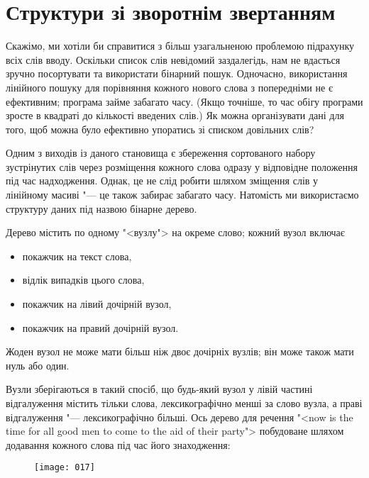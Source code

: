 \documentclass[a4paper,12pt]{book}
\begin{document}
\section{Структури зі зворотнім звертанням}


  Скажімо, ми хотіли би справитися з більш узагальненою проблемою підрахунку всіх слів
  вводу. Оскільки список слів невідомий заздалегідь, нам не вдасться зручно посортувати
  та використати бінарний пошук. Одночасно, використання лінійного пошуку для порівняння
  кожного нового слова з попередніми не є ефективним; програма займе забагато часу. (Якщо
  точніше, то час обігу програми зросте в квадраті до кількості введених слів.) Як можна
  організувати дані для того, щоб можна було ефективно упоратись зі списком довільних
  слів?

  Одним з виходів із даного становища є збереження сортованого набору зустрінутих слів
  через розміщення кожного слова одразу у відповідне положення під час надходження.
  Однак, це не слід робити шляхом зміщення слів у лінійному масиві "--- це також забирає
  забагато часу. Натомість ми використаємо структуру даних під назвою бінарне дерево.

  Дерево містить по одному "<вузлу"> на окреме слово; кожний вузол включає
  \begin{itemize}
    \item покажчик на текст слова,
    \item відлік випадків цього слова,
    \item покажчик на лівий дочірній вузол,
    \item покажчик на правий дочірній вузол.
  \end{itemize}

  Жоден вузол не може мати більш ніж двоє дочірніх вузлів; він може також мати нуль
  або один.

  Вузли зберігаються в такий спосіб, що будь-який вузол у лівій частині відгалуження
  містить тільки слова, лексикографічно менші за слово вузла, а праві відгалуження "---
  лексикографічно більші. Ось дерево для речення "<now is the time for all good men to
  come to the aid of their party"> побудоване шляхом додавання кожного слова під час його
  знаходження:
  \begin{figure}[!htb]
  \centering
  \texttt{[image: 017]}
  \end{figure}
\end{document}

